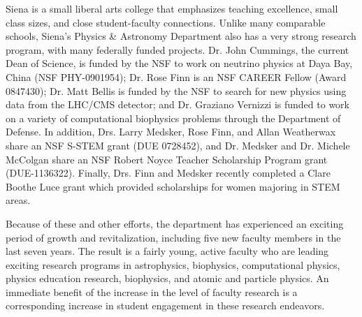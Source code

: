 \documentclass[12pt, preprint]{aastex}
\begin{document}

				
Siena is a small liberal arts college that emphasizes teaching excellence, small
class sizes, and close student-faculty connections. Unlike many comparable
schools, Siena's Physics \& Astronomy Department also has a very strong research
program, with many federally funded projects. Dr. John Cummings, the current
Dean of Science, is funded by the NSF to work on neutrino physics at Daya Bay,
China (NSF PHY-0901954); Dr. Rose Finn is an NSF CAREER Fellow (Award 0847430);
Dr. Matt Bellis is funded by the NSF to search for new physics using data from
the LHC/CMS detector; and Dr. Graziano Vernizzi is funded to work on a variety
of computational biophysics problems through the Department of Defense.  In
addition, Drs. Larry Medsker, Rose Finn, and Allan Weatherwax share an NSF
S-STEM grant (DUE 0728452), and Dr. Medsker and Dr. Michele McColgan share an
NSF Robert Noyce Teacher Scholarship Program grant (DUE-1136322).  Finally,
Drs. Finn and Medsker recently completed a Clare Boothe Luce grant which
provided scholarships for women majoring in STEM areas.

Because of these and other efforts, the department has experienced an exciting
period of growth and revitalization, including five new faculty members in the
last seven years.  The result is a fairly young, active faculty who are leading
exciting research programs in astrophysics, biophysics, computational physics,
physics education research, biophysics, and atomic and particle physics. An
immediate benefit of the increase in the level of faculty research is a
corresponding increase in student engagement in these research endeavors.
\end{document}
